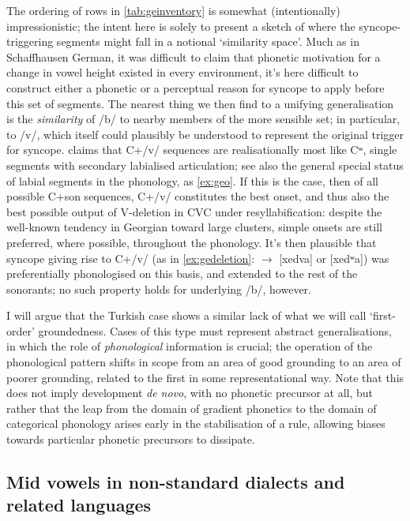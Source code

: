 The ordering of rows in \cref{tab:geinventory} is somewhat (intentionally) impressionistic; the intent here is solely to present a sketch of where the syncope-triggering segments might fall in a notional `similarity space'. Much as in Schaffhausen German, it was difficult to claim that phonetic motivation for a change in vowel height existed in every environment, it's here difficult to construct either a phonetic or a perceptual reason for syncope to apply before this set of segments. The nearest thing we then find to a unifying generalisation is the \emph{similarity} of /b/ to nearby members of the more sensible set; in particular, to /v/, which itself could plausibly be understood to represent the original trigger for syncope. \citet[p.~88]{Butskh2002} claims that C+/v/ sequences are realisationally most like Cʷ, single segments with secondary labialised articulation; see also the general special status of labial segments in the phonology, as \cref{ex:geo}. If this is the case, then of all possible C+son sequences, C+/v/ constitutes the best onset, and thus also the best possible output of V-deletion in CVC under resyllabification: despite the well-known tendency in Georgian toward large clusters, simple onsets are still preferred, where possible, throughout the phonology. It's then plausible that syncope giving rise to C+/v/ (as in \cref{ex:gedeletion}:  $\rightarrow$ [xedva] or [xedʷa]) was preferentially phonologised on this basis, and extended to the rest of the sonorants; no such property holds for underlying /b/, however.

I will argue that the Turkish case shows a similar lack of what we will call `first-order' groundedness. Cases of this type must represent abstract generalisations, in which the role of \emph{phonological} information is crucial; the operation of the phonological pattern shifts in scope from an area of good grounding to an area of poorer grounding, related to the first in some representational way. Note that this does not imply development \emph{de novo}, with no phonetic precursor at all, but rather that the leap from the domain of gradient phonetics to the domain of categorical phonology arises early in the stabilisation of a rule, allowing biases towards particular phonetic precursors to dissipate.

\subsection{Mid vowels in non-standard dialects and related languages}\label{ss:dialectology}


